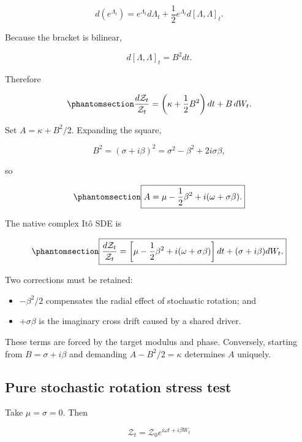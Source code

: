 \documentclass[
  english,
  10pt,
  letterpaper,
  DIV=11,
  numbers=noendperiod]{scrartcl}
\providecommand{\tightlist}{%
  \setlength{\itemsep}{0pt}\setlength{\parskip}{0pt}}
\begin{document}
\[
d(e^{\Lambda_t})
=
e^{\Lambda_t}d\Lambda_t
+\frac12e^{\Lambda_t}d[\Lambda,\Lambda]_t.
\]

Because the bracket is bilinear,

\[
d[\Lambda,\Lambda]_t=B^2dt.
\]

Therefore

\begin{equation}\protect\phantomsection\label{eq-ito-compact}{
\frac{d\mathcal Z_t}{\mathcal Z_t}
=
\left(\kappa+\frac12B^2\right)dt+B\,dW_t.
}\end{equation}

Set \(A=\kappa+B^2/2\). Expanding the square,

\[
B^2=(\sigma+i\beta)^2
=\sigma^2-\beta^2+2i\sigma\beta,
\]

so

\begin{equation}\protect\phantomsection\label{eq-drift-A}{
\boxed{
A
=
\mu-\frac12\beta^2+i(\omega+\sigma\beta).
}
}\end{equation}

The native complex Itô SDE is

\begin{equation}\protect\phantomsection\label{eq-final-sde}{
\boxed{
\frac{d\mathcal Z_t}{\mathcal Z_t}
=
\left[
\mu-\frac12\beta^2+i(\omega+\sigma\beta)
\right]dt
+(\sigma+i\beta)dW_t.
}
}\end{equation}

Two corrections must be retained:

\begin{itemize}
\tightlist
\item
  \(-\beta^2/2\) compensates the radial effect of stochastic rotation;
  and
\item
  \(+\sigma\beta\) is the imaginary cross drift caused by a shared
  driver.
\end{itemize}

These terms are forced by the target modulus and phase. Conversely,
starting from \(B=\sigma+i\beta\) and demanding \(A-B^2/2=\kappa\)
determines \(A\) uniquely.

\subsection{Pure stochastic rotation stress
test}\label{pure-stochastic-rotation-stress-test}

Take \(\mu=\sigma=0\). Then

\[
\mathcal Z_t=\mathcal Z_0e^{i\omega t+i\beta W_t}
\]
\end{document}
